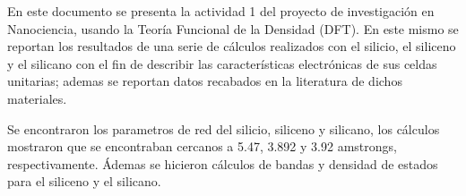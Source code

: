 
\noindent 				%

En este documento se presenta la actividad 1 del proyecto de investigación en Nanociencia,
usando la Teoría Funcional de la Densidad (DFT). 
En este mismo se reportan los resultados de una serie de cálculos 
realizados con el silicio, el siliceno y el silicano con el fin de describir las características electrónicas de sus
celdas unitarias; ademas se reportan datos recabados en la literatura de dichos 
materiales.


Se encontraron los parametros de red del silicio, siliceno y silicano, los cálculos mostraron
que se encontraban cercanos a 5.47, 3.892 y 3.92 amstrongs, respectivamente. 
Ádemas se hicieron cálculos de bandas y densidad de estados para el siliceno y el silicano.